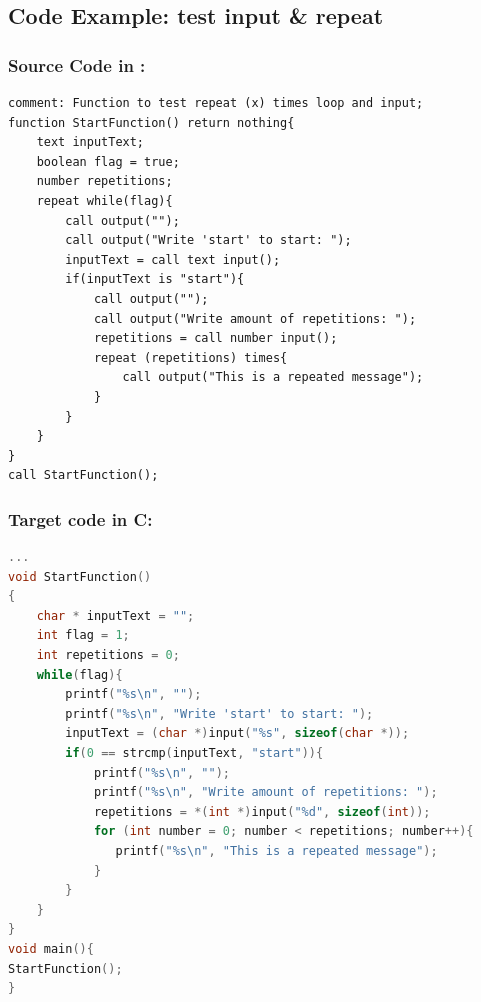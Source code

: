 \subsection{Code Example: test input \& repeat}

\subsubsection{Source Code in \lang:}
\begin{lstlisting}[language = scriptkid, firstnumber=1, label={list:acceptance_test_repeat_input_test}, caption=Acceptance test input of the repeat loops code example]
comment: Function to test repeat (x) times loop and input; 
function StartFunction() return nothing{
    text inputText; 
    boolean flag = true; 
    number repetitions; 
    repeat while(flag){ 
        call output(""); 
        call output("Write 'start' to start: "); 
        inputText = call text input(); 
        if(inputText is "start"){ 
            call output(""); 
            call output("Write amount of repetitions: "); 
            repetitions = call number input(); 
            repeat (repetitions) times{ 
                call output("This is a repeated message"); 
            }           
        } 
    } 
} 
call StartFunction(); 
\end{lstlisting}

\subsubsection{Target code in C:}
\begin{lstlisting}[language = C, firstnumber=106, label={list:acceptance_test_repeat_input_test_InC}, caption=Acceptance test input of the repeat loops code example output in C]
...
void StartFunction()
{
    char * inputText = "";
    int flag = 1;
    int repetitions = 0;
    while(flag){
        printf("%s\n", "");
        printf("%s\n", "Write 'start' to start: ");
        inputText = (char *)input("%s", sizeof(char *));
        if(0 == strcmp(inputText, "start")){
            printf("%s\n", "");
            printf("%s\n", "Write amount of repetitions: ");
            repetitions = *(int *)input("%d", sizeof(int));
            for (int number = 0; number < repetitions; number++){
               printf("%s\n", "This is a repeated message");
            }
        }
    }
}
void main(){
StartFunction();
}
\end{lstlisting}

